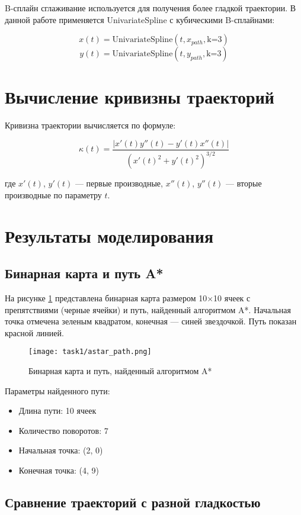 B-сплайн сглаживание используется для получения более гладкой траектории. В данной работе применяется UnivariateSpline с кубическими B-сплайнами:

$$x(t) = \text{UnivariateSpline}(t, x_{path}, \text{k=3})$$
$$y(t) = \text{UnivariateSpline}(t, y_{path}, \text{k=3})$$

\section{Вычисление кривизны траекторий}

Кривизна траектории вычисляется по формуле:

$$\kappa(t) = \frac{|x'(t)y''(t) - y'(t)x''(t)|}{(x'(t)^2 + y'(t)^2)^{3/2}}$$

где $x'(t)$, $y'(t)$ --- первые производные, $x''(t)$, $y''(t)$ --- вторые производные по параметру $t$.

\section{Результаты моделирования}

\subsection{Бинарная карта и путь A*}

На рисунке \ref{fig:astar_path} представлена бинарная карта размером 10×10 ячеек с препятствиями (черные ячейки) и путь, найденный алгоритмом A*. Начальная точка отмечена зеленым квадратом, конечная --- синей звездочкой. Путь показан красной линией.

\begin{figure}[H]
\centering
\texttt{[image: task1/astar\_path.png]}
\caption{Бинарная карта и путь, найденный алгоритмом A*}
\label{fig:astar_path}
\end{figure}

Параметры найденного пути:
\begin{itemize}
\item Длина пути: 10 ячеек
\item Количество поворотов: 7
\item Начальная точка: (2, 0)
\item Конечная точка: (4, 9)
\end{itemize}

\subsection{Сравнение траекторий с разной гладкостью}

